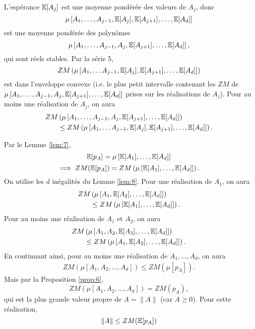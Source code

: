 \begin{preuve}
  L'espérance $\mathbb{E}[A_j]$ est une moyenne pondérée des valeurs de $A_j$, donc 
  \[ \mu\left[A_1, \ldots , A_{j-1}, \mathbb{E}[A_j], \mathbb{E}[A_{j+1}], \ldots , \mathbb{E}[A_d]\right] \]
  est une moyenne pondérée des polynômes 
  \[ \mu\left[A_1, \ldots , A_{j-1}, A_j, \mathbb{E}[A_{j+1}], \ldots , \mathbb{E}[A_d]\right], \]
  qui sont réels stables. Par la série 5, 
  \[ ZM \left( \mu \left[ A_1, \ldots A_{j-1}, \mathbb{E}[A_j],  \mathbb{E}[A_{j+1}], \ldots , \mathbb{E}[A_d]\right] \right) \]
  est dans l'enveloppe convexe (i.e. le plus petit intervalle contenant les $ZM$ de $\mu\left[A_1, \ldots , A_{j-1},
    A_j, \mathbb{E}[A_{j+1}], \ldots , \mathbb{E}[A_d] \right]$ prises sur les réalisations de $A_j$). Pour au moins une
  réalisation de $A_j$, on aura
  \begin{align*}
    ZM&\left( \mu\left[A_1, \ldots , A_{j-1}, A_j, \mathbb{E}[A_{j+1}], \ldots , \mathbb{E}[A_d]\right] \right) \\
    &\leq ZM \left(
    \mu \left[ A_1, \ldots A_{j-1}, \mathbb{E}[A_j],  \mathbb{E}[A_{j+1}], \ldots , \mathbb{E}[A_d]\right] \right).
  \end{align*}
\end{preuve}


\begin{preuve}[du Théorème 2]
  Par le Lemme \ref{lem:7}, 
  \[ \mathbb{E}[p_A] = \mu \left[ \mathbb{E}[A_1], \ldots , \mathbb{E}[A_d] \right] \] 
  \[ \implies ZM(\mathbb{E}[p_A]) = ZM \left( \mu \left[ \mathbb{E}[A_1], \ldots , \mathbb{E}[A_d] \right] \right). \]
  On utilise les $d$ inégalités du Lemme \ref{lem:8}. Pour une réalisation de $A_1$, on aura
  \begin{align*}
    ZM & \left(  \mu \left[ A_1, \mathbb{E}[A_2], \ldots , \mathbb{E}[A_d] \right] \right)\\
       &\leq ZM \left( \mu \left[ \mathbb{E}[A_1], \ldots , \mathbb{E}[A_d]\right] \right).
  \end{align*}
  Pour au moins une réalisation de $A_1$ et $A_2$, on aura
  \begin{align*}
    ZM & \left(  \mu \left[ A_1, A_2, \mathbb{E}[A_3], \ldots , \mathbb{E}[A_d] \right] \right)\\
       &\leq ZM \left( \mu \left[ A_1, \mathbb{E}[A_2], \ldots , \mathbb{E}[A_d]\right] \right).
  \end{align*}
  En continuant ainsi, pour au moins une réalisation de $A_1, \ldots , A_d$, on aura 
  \begin{align*}
  ZM \left(  \mu \left[ A_1, A_2, \ldots , A_d \right] \right) \leq ZM \left( \mu \left[ p_A\right] \right).
  \end{align*}
  Mais par la Proposition \ref{prop:6}, 
  \[  ZM \left(  \mu \left[ A_1, A_2, \ldots , A_d \right] \right)  = ZM(p_A), \]
  qui est la plus grande valeur propre de $A = \|A\|$ (car $A \geq 0$). Pour cette réalisation, 
  \[ \|A\| \leq ZM(\mathbb{E}[p_A]) \]
\end{preuve}


